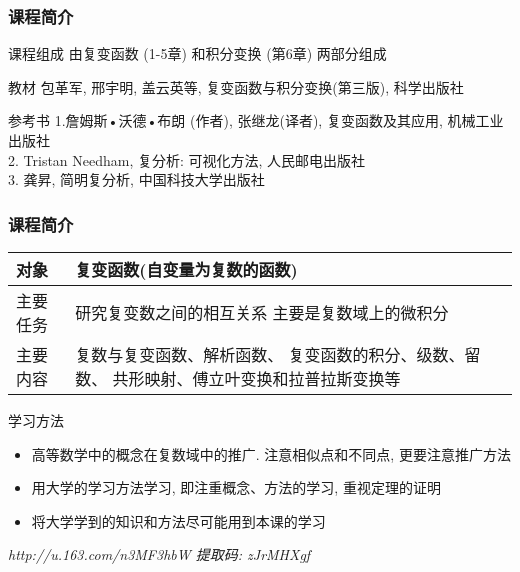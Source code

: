 \documentclass{beamer}
\begin{document}
\begin{frame}[t]
\frametitle{课程简介}
\begin{block}{课程组成}
由复变函数 (1-5章) 和积分变换 (第6章) 两部分组成
\end{block}

\begin{block}{教材}
包革军, 邢宇明, 盖云英等, 复变函数与积分变换(第三版), 科学出版社
\end{block}

\begin{block}{参考书}
1.詹姆斯•沃德•布朗 (作者), 张继龙(译者), 复变函数及其应用, 机械工业出版社\\
2. Tristan Needham, 复分析: 可视化方法, 人民邮电出版社\\
3. 龚昇, 简明复分析, 中国科技大学出版社
\end{block}

\end{frame}


\begin{frame}[t]
\frametitle{课程简介}

\begin{table}
\begin{tabular}{l p{7cm} }
\toprule
对象 & 复变函数(自变量为复数的函数) \\
\midrule
主要任务 & 研究复变数之间的相互关系
主要是复数域上的微积分 \\
\midrule
主要内容 & 复数与复变函数、解析函数、
复变函数的积分、级数、留数、
共形映射、傅立叶变换和拉普拉斯变换等 \\
\bottomrule
\end{tabular}
\end{table}

\begin{block}{学习方法}
\begin{itemize}
\item 高等数学中的概念在复数域中的推广. 注意相似点和不同点, 更要注意推广方法
\item 用大学的学习方法学习, 即注重概念、方法的学习, 重视定理的证明
\item 将大学学到的知识和方法尽可能用到本课的学习
\end{itemize}
\end{block}
\textit{http://u.163.com/n3MF3hbW  提取码: zJrMHXgf}

\end{frame}
\end{document}
